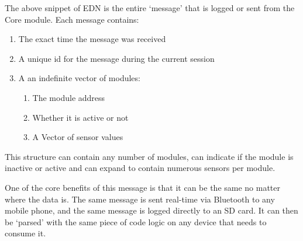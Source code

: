 The above snippet of EDN is the entire `message' that is logged or sent from the Core module. Each message contains:

\begin{enumerate}
  \item The exact time the message was received
  \item A unique id for the message during the current session
  \item A an indefinite vector of modules:
  \begin{enumerate}
    \item The module address
    \item Whether it is active or not
    \item A Vector of sensor values 
  \end{enumerate}
\end{enumerate}

This structure can contain any number of modules, can indicate if the module is inactive or active and can expand to contain numerous sensors per module. 

One of the core benefits of this message is that it can be the same no matter where the data is. The same message is sent real-time via Bluetooth to any mobile phone, and the same message is logged directly to an SD card. It can then be `parsed' with the same piece of code logic on any device that needs to consume it.